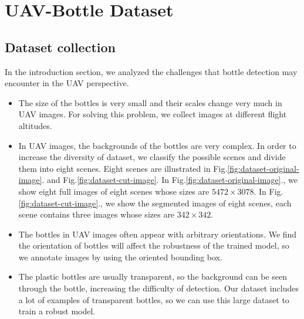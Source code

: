 \section{UAV-Bottle Dataset}
\label{sec:dataset}


\subsection{Dataset collection}
\label{ssec:image_collection}

In the introduction section, we analyzed the challenges that bottle detection may encounter in the UAV perspective.
\begin{itemize}
	\item The size of the bottles is very small and their scales change very much in UAV images. For solving this problem, we collect images at different flight altitudes.
	
	\item In UAV images, the backgrounds of the bottles are very complex. In order to increase the diversity of dataset, we classify the possible scenes and divide them into eight scenes. Eight scenes are illustrated in Fig.\ref{fig:dataset-original-image}. and Fig.\ref{fig:dataset-cut-image}. In Fig.\ref{fig:dataset-original-image}., we show eight full images of eight scenes whose sizes are $ 5472\times 3078 $. In Fig.\ref{fig:dataset-cut-image}., we show the segmented images of eight scenes, each scene contains three images whose sizes are $ 342 \times 342 $.
	
	\item The bottles in UAV images often appear with arbitrary orientations. We find the orientation of bottles will affect the robustness of the trained model, so we annotate images by using the oriented bounding box.
	
	\item The plastic bottles are usually transparent, so the background can be seen through the bottle, increasing the difficulty of detection. Our dataset includes a lot of examples of  transparent bottles, so we can use this large dataset to train a robust model.
\end{itemize}
